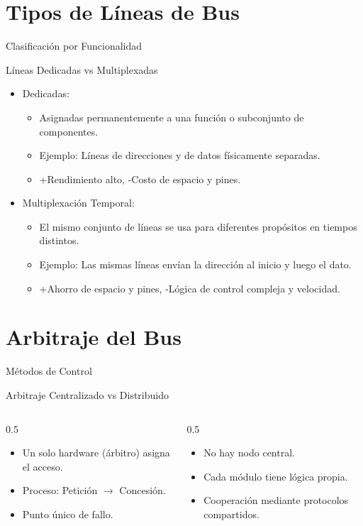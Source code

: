 \documentclass[presentation]{beamer}
\begin{document}
\section{Tipos de Líneas de Bus}
\label{sec:org3807706}
\begin{frame}[label={sec:org897ba65}]{Clasificación por Funcionalidad}
\begin{block}{Líneas Dedicadas vs Multiplexadas}
\begin{itemize}
\item \alert{Dedicadas}:
\begin{itemize}
\item Asignadas permanentemente a una función o subconjunto de
componentes.
\item Ejemplo: Líneas de direcciones y de datos físicamente separadas.
\item +Rendimiento alto, -Costo de espacio y pines.
\end{itemize}
\item \alert{Multiplexación Temporal}:
\begin{itemize}
\item El mismo conjunto de líneas se usa para diferentes propósitos en
tiempos distintos.
\item Ejemplo: Las mismas líneas envían la dirección al inicio y luego
el dato.
\item +Ahorro de espacio y pines, -Lógica de control compleja y
velocidad.
\end{itemize}
\end{itemize}
\end{block}
\end{frame}
\section{Arbitraje del Bus}
\label{sec:org95e0d56}
\begin{frame}[label={sec:org6e52ce1}]{Métodos de Control}
\begin{block}{Arbitraje Centralizado vs Distribuido}
\begin{columns}
\begin{column}{0.5\columnwidth}
\begin{itemize}
\item Un solo hardware (\alert{árbitro}) asigna el acceso.
\item Proceso: Petición \(\rightarrow\) Concesión.
\item Punto único de fallo.
\end{itemize}
\end{column}
\begin{column}{0.5\columnwidth}
\begin{itemize}
\item No hay nodo central.
\item Cada módulo tiene lógica propia.
\item Cooperación mediante protocolos compartidos.
\end{itemize}
\end{column}
\end{columns}
\end{block}
\end{frame}
\end{document}
